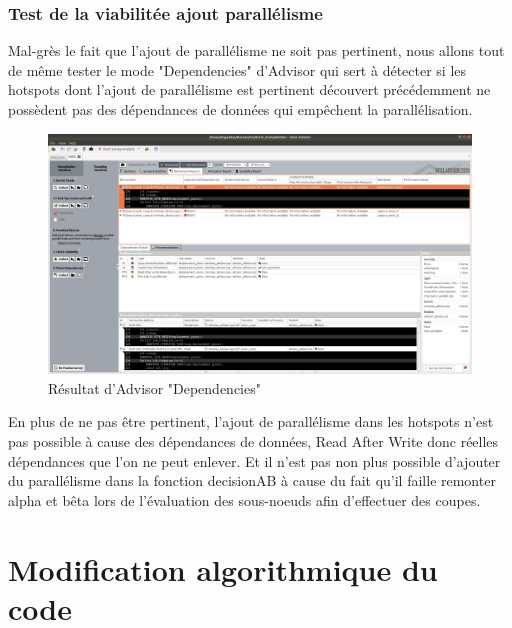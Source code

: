 \documentclass[
 aip,
 jmp,
 amsmath,amssymb,
 reprint
]{revtex4-1}
\begin{document}
\subsubsection{Test de la viabilitée ajout parallélisme}

Mal-grès le fait que l'ajout de parallélisme ne soit pas pertinent, nous allons tout de même tester le mode "Dependencies" d'Advisor qui sert à détecter si les hotspots dont l'ajout de parallélisme est pertinent découvert précédemment ne possèdent pas des dépendances de données qui empêchent la parallélisation.

\begin{figure}[H]
  \includegraphics[width=\linewidth, keepaspectratio=true]{dependecies.png}
  \caption{Résultat d'Advisor "Dependencies"\label{Fig:advisor_dependencies}}
\end{figure}

En plus de ne pas être pertinent, l'ajout de parallélisme dans les hotspots n'est pas possible à cause des dépendances de données, Read After Write donc réelles dépendances que l'on ne peut enlever. Et il n'est pas non plus possible d'ajouter du parallélisme dans la fonction decisionAB à cause du fait qu'il faille remonter alpha et bêta lors de l'évaluation des sous-noeuds afin d'effectuer des coupes.

\section{Modification algorithmique du code}
\end{document}
